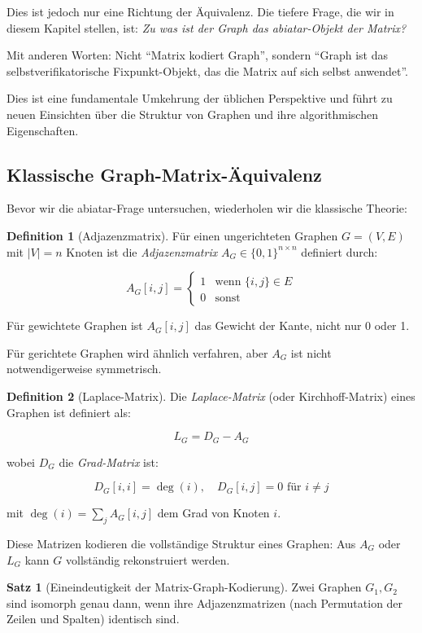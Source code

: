 \documentclass[a4paper,12pt]{article}
\theoremstyle{definition}
\newtheorem{definition}{Definition}
\newtheorem{satz}{Satz}
\begin{document}
Dies ist jedoch nur eine Richtung der Äquivalenz. Die tiefere Frage, die wir in diesem Kapitel stellen, ist: \textit{Zu was ist der Graph das abiatar-Objekt der Matrix?}

Mit anderen Worten: Nicht ``Matrix kodiert Graph'', sondern ``Graph ist das selbstverifikatorische Fixpunkt-Objekt, das die Matrix auf sich selbst anwendet''.

Dies ist eine fundamentale Umkehrung der üblichen Perspektive und führt zu neuen Einsichten über die Struktur von Graphen und ihre algorithmischen Eigenschaften.

\subsection{Klassische Graph-Matrix-Äquivalenz}

Bevor wir die abiatar-Frage untersuchen, wiederholen wir die klassische Theorie:

\begin{definition}[Adjazenzmatrix]
Für einen ungerichteten Graphen $G = (V, E)$ mit $|V| = n$ Knoten ist die \textit{Adjazenzmatrix} $A_G \in \{0,1\}^{n \times n}$ definiert durch:

$$A_G[i,j] = \begin{cases}
1 & \text{wenn } \{i,j\} \in E \\
0 & \text{sonst}
\end{cases}$$

Für gewichtete Graphen ist $A_G[i,j]$ das Gewicht der Kante, nicht nur 0 oder 1.

Für gerichtete Graphen wird ähnlich verfahren, aber $A_G$ ist nicht notwendigerweise symmetrisch.
\end{definition}

\begin{definition}[Laplace-Matrix]
Die \textit{Laplace-Matrix} (oder Kirchhoff-Matrix) eines Graphen ist definiert als:

$$L_G = D_G - A_G$$

wobei $D_G$ die \textit{Grad-Matrix} ist:

$$D_G[i,i] = \deg(i), \quad D_G[i,j] = 0 \text{ für } i \neq j$$

mit $\deg(i) = \sum_j A_G[i,j]$ dem Grad von Knoten $i$.
\end{definition}

Diese Matrizen kodieren die vollständige Struktur eines Graphen: Aus $A_G$ oder $L_G$ kann $G$ vollständig rekonstruiert werden.

\begin{satz}[Eineindeutigkeit der Matrix-Graph-Kodierung]
Zwei Graphen $G_1, G_2$ sind isomorph genau dann, wenn ihre Adjazenzmatrizen (nach Permutation der Zeilen und Spalten) identisch sind.
\end{satz}
\end{document}
